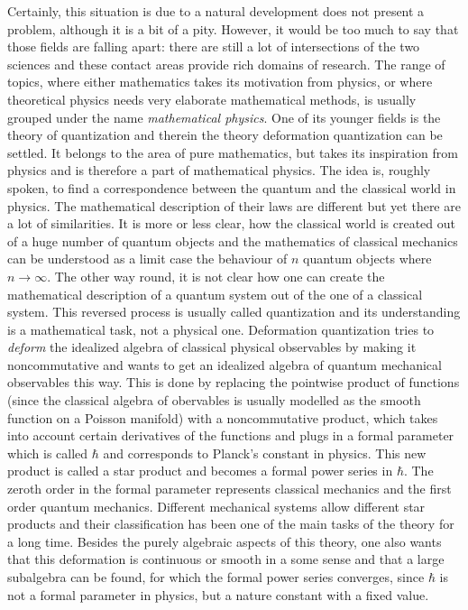 Certainly, this situation is due to a natural development does not present a 
problem, although it is a bit of a pity. However, it would be too much to say 
that those fields are falling apart: there are still a lot of intersections of 
the two sciences and these contact areas provide rich domains of research. The 
range of topics, where either mathematics takes its motivation from physics, 
or where theoretical physics needs very elaborate mathematical methods, is 
usually grouped under the name \emph{mathematical physics}. One of its younger 
fields is the theory of quantization and therein the theory deformation 
quantization can be settled. It belongs to the area of 
pure mathematics, but takes its inspiration from physics and is therefore a 
part of mathematical physics. The idea is, roughly spoken, to find a 
correspondence between the quantum and the classical world in physics. The 
mathematical description of their laws are different but yet there are a lot of 
similarities. It is more or less clear, how the classical world is created out 
of a huge number of quantum objects and the mathematics of classical mechanics 
can be understood as a limit case the behaviour of $n$ quantum objects where 
$n \longrightarrow \infty$. The other way round, it is not clear how one can 
create the mathematical description of a quantum system out of the one of a 
classical system. This reversed process is usually called quantization and its 
understanding is a mathematical task, not a physical one. Deformation 
quantization tries to \emph{deform} the idealized algebra of classical physical 
observables by making it noncommutative and wants to get an idealized algebra 
of quantum mechanical observables this way. This is done by replacing the 
pointwise product of functions (since the classical algebra of obervables is 
usually modelled as the smooth function on a Poisson manifold) with a 
noncommutative product, which takes into account certain derivatives of the 
functions and plugs in a formal parameter which is called $\hbar$ and 
corresponds to Planck's constant in physics. This new product is called 
a star product and becomes a formal power series in $\hbar$. The zeroth order 
in the formal parameter represents classical mechanics and the first order 
quantum mechanics. Different mechanical systems allow different star products 
and their classification has been one of the main tasks of the theory for a 
long time. Besides the purely algebraic aspects of this theory, one also wants 
that this deformation is continuous or smooth in a some sense and that a 
large subalgebra can be found, for which the formal power series
converges, since $\hbar$ is not a formal parameter in physics, but a nature 
constant with a fixed value.



